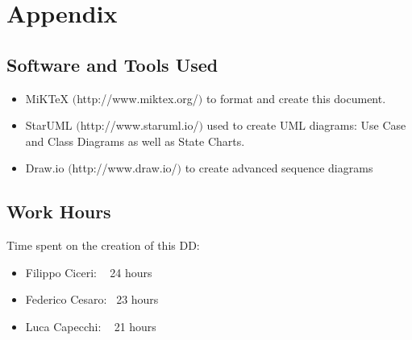 \section{Appendix}

	\subsection{Software and Tools Used}
	\begin{itemize}
		\item MiKTeX $($http://www.miktex.org/$)$ to format and create this document.
		\item StarUML $($http://www.staruml.io/$)$ used to create UML diagrams: Use Case and Class Diagrams as well as State Charts.
		\item Draw.io $($http://www.draw.io/$)$ to create advanced sequence diagrams
	\end{itemize}

	\subsection{Work Hours}
		Time spent on the creation of this DD:
		\begin{itemize}
			\item Filippo Ciceri: ~ 24 hours
			\item Federico Cesaro: ~23 hours
			\item Luca Capecchi: ~ 21 hours
		\end{itemize}

